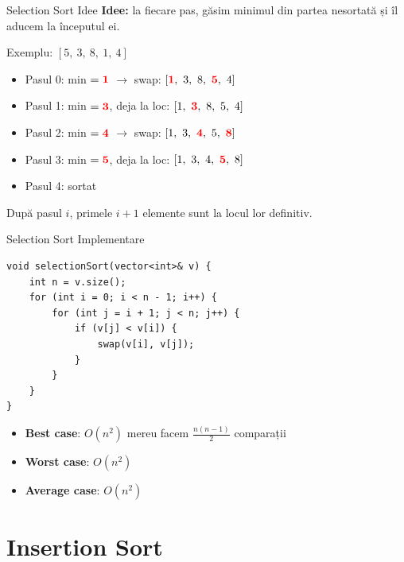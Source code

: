 ﻿\documentclass{beamer}
\begin{document}
\begin{frame}{Selection Sort \textemdash{} Idee}
  \textbf{Idee:} la fiecare pas, găsim minimul din partea nesortată și îl aducem la începutul ei.
  \bigskip

  Exemplu: $[5,\ 3,\ 8,\ 1,\ 4]$
  \begin{itemize}
    \item Pasul 0: min $= \textcolor{red}{\mathbf{1}}$ $\rightarrow$ swap: $[\textcolor{red}{\mathbf{1}},\ 3,\ 8,\ \textcolor{red}{\mathbf{5}},\ 4]$
    \item Pasul 1: min $= \textcolor{red}{\mathbf{3}}$, deja la loc: $[1,\ \textcolor{red}{\mathbf{3}},\ 8,\ 5,\ 4]$
    \item Pasul 2: min $= \textcolor{red}{\mathbf{4}}$ $\rightarrow$ swap: $[1,\ 3,\ \textcolor{red}{\mathbf{4}},\ 5,\ \textcolor{red}{\mathbf{8}}]$
    \item Pasul 3: min $= \textcolor{red}{\mathbf{5}}$, deja la loc: $[1,\ 3,\ 4,\ \textcolor{red}{\mathbf{5}},\ 8]$
    \item Pasul 4: sortat \checkmark
  \end{itemize}
  \medskip
  După pasul $i$, primele $i+1$ elemente sunt la locul lor definitiv.
\end{frame}

\begin{frame}[fragile]{Selection Sort \textemdash{} Implementare}
  \begin{lstlisting}
void selectionSort(vector<int>& v) {
    int n = v.size();
    for (int i = 0; i < n - 1; i++) {
        for (int j = i + 1; j < n; j++) {
            if (v[j] < v[i]) {
                swap(v[i], v[j]);
            }
        }
    }
}
  \end{lstlisting}
  \begin{itemize}
    \item \textbf{Best case}: $O(n^2)$ \textemdash{} mereu facem $\tfrac{n(n-1)}{2}$ comparații
    \item \textbf{Worst case}: $O(n^2)$
    \item \textbf{Average case}: $O(n^2)$
  \end{itemize}
\end{frame}

\section{Insertion Sort}
\end{document}
